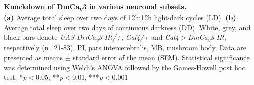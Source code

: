\label{fig:S5}
\textbf{Knockdown of DmCa\textsubscript{v}3 in various neuronal subsets.}
\\
\textbf {(a)} Average total sleep over two days of 12h:12h light-dark cycles (LD).
\textbf {(b)} Average total sleep over two days of continuous darkness (DD).
White, grey, and black bars denote \emph{UAS-DmCa\textsubscript{v}3-IR/+}, \emph{Gal4/+} and \emph{Gal4$>$DmCa\textsubscript{v}3-IR}, respectively (n=21-83).
PI, pars intercerebralis, MB, mushroom body. 
Data are presented as means $\pm$ standard error of the mean (SEM).
Statistical significance was determined using Welch's ANOVA followed by the Games-Howell post hoc test.
*\emph{p}$<$0.05, **\emph{p}$<$0.01, ***\emph{p}$<$0.001
